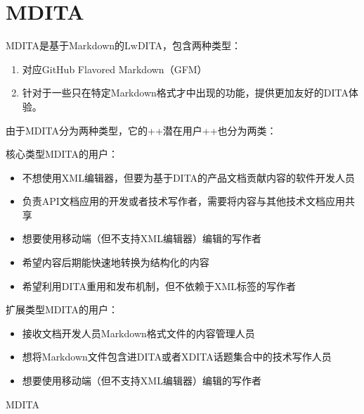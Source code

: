 \documentclass[letterpaper,10pt,english]{sphinxmanual}
\begin{document}
\section{MDITA}
\label{\detokenize{chap4:mdita}}
MDITA是基于Markdown的LwDITA，包含两种类型：
\begin{enumerate}
%
\item {} 
对应GitHub Flavored Markdown（GFM）

\item {} 
针对于一些只在特定Markdown格式才中出现的功能，提供更加友好的DITA体验。

\end{enumerate}

由于MDITA分为两种类型，它的++潜在用户++也分为两类：

核心类型MDITA的用户：
\begin{itemize}
\item {} 
不想使用XML编辑器，但要为基于DITA的产品文档贡献内容的软件开发人员

\item {} 
负责API文档应用的开发或者技术写作者，需要将内容与其他技术文档应用共享

\item {} 
想要使用移动端（但不支持XML编辑器）编辑的写作者

\item {} 
希望内容后期能快速地转换为结构化的内容

\item {} 
希望利用DITA重用和发布机制，但不依赖于XML标签的写作者

\end{itemize}

扩展类型MDITA的用户：
\begin{itemize}
\item {} 
接收文档开发人员Markdown格式文件的内容管理人员

\item {} 
想将Markdown文件包含进DITA或者XDITA话题集合中的技术写作人员

\item {} 
想要使用移动端（但不支持XML编辑器）编辑的写作者


\end{itemize}

MDITA 
\end{document}
